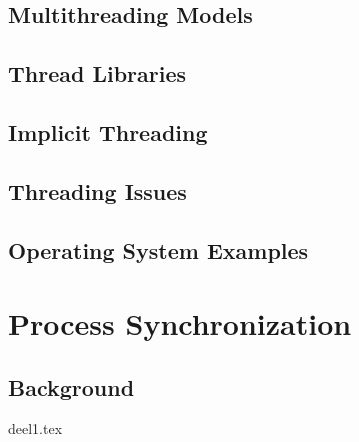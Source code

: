 \documentclass[a4paper,11pt]{report}
\newcommand\PartialTocChapter{%
\startcontents[chapters] %
\printcontents[chapters]{}{1}{\setcounter{tocdepth}{1}}
\newpage
}%
\begin{document}
\section{Multithreading Models}
\lipsum
\section{Thread Libraries}
\lipsum
\section{Implicit Threading}
\lipsum
\section{Threading Issues}
\lipsum
\section{Operating System Examples}
\lipsum



\chapter{Process Synchronization}

%

\PartialTocChapter

\setlength{\headheight}{15pt}
\pagestyle{fancy}
\renewcommand{\sectionmark}[1]{\markright{#1}{}}

\fancyhf{}
\fancyhead[RH]{\textbf{\textit{\nouppercase{\leftmark}}}}
\fancyhead[LH]{\textbf{\textit{\nouppercase{\rightmark}}}}
\renewcommand{\footrulewidth}{1pt}
\renewcommand{\headrulewidth}{1pt}

\section{Background}
\lipsum
{deel1.tex}
\end{document}

